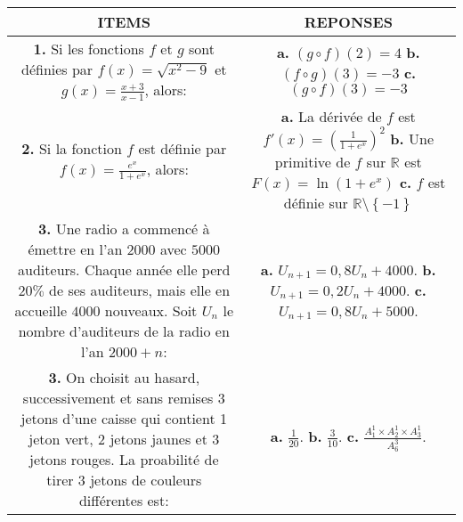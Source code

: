 \documentclass[12pt]{article}
\begin{document}
\begin{tabular}{|c|c|}
\hline
\textbf{ITEMS} & \textbf{REPONSES}\\
\hline
\makecell[l]{\textbf{1.} Si les fonctions $f$ et $g$ sont définies par \\ $f(x)=\sqrt{x^{2}-9}$ et $g(x)=\frac{x+3}{x-1}$, alors:} &
\makecell[l]{\textbf{a.} $(g\circ f)(2)=4$ \\ \textbf{b.} $(f\circ g)(3)=-3$ \\ \textbf{c.} $(g\circ f)(3)=-3$}\\
\hline
\makecell[l]{\textbf{2.} Si la fonction $f$ est définie par \\ $f(x)=\frac{e^{x}}{1+e^{x}}$, alors:} &
\makecell[l]{\textbf{a.} La dérivée de $f$ est $f'(x)=\left(\frac{1}{1+e^{x}}\right)^{2}$ \\ \textbf{b.} Une primitive de $f$ sur $\mathbb{R}$ est\\ $F(x)=\ln(1+e^{x})$ \\ \textbf{c.} $f$ est définie sur $\mathbb{R}\setminus\left\lbrace -1\right\rbrace $}\\ 
\hline
\makecell[l]{\textbf{3.} Une radio a commencé à émettre en l'an $2000$\\ avec $5000$ auditeurs. Chaque année elle perd \\ $20\%$ de ses auditeurs, mais elle en accueille $4000$\\ nouveaux. Soit $U_{n}$ le nombre d'auditeurs de la\\ radio en  l'an $2000+n$: } & \makecell[l]{\textbf{a.} $U_{n+1}=0,8U_{n}+4000$. \\ 
\textbf{b.} $U_{n+1}=0,2U_{n}+4000$. \\ \textbf{c.} $U_{n+1}=0,8U_{n}+5000$. }\\
\hline
\makecell[l]{\textbf{3.} On choisit au hasard, successivement et sans\\ remises $3$ jetons d'une caisse qui contient 1 jeton\\ vert, 2 jetons jaunes et 3 jetons rouges.\\ La proabilité de tirer 3 jetons de couleurs différentes est:} & 
\makecell[l]{\textbf{a.} $\frac{1}{20}$. \\ 
\textbf{b.} $\frac{3}{10}$. \\ \textbf{c.} $\frac{ A_{1}^{1}\times A_{2}^{1}\times A_{3}^{1}}{ A_{6}^{3} }$. }\\
\hline
\end{tabular}
\end{document}
